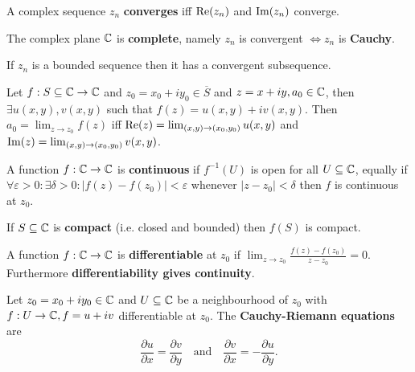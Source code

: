 \begin{multicols}{2}
\begin{theorem}[1.2.9]
A complex sequence $z_n$ \textbf{converges} iff $\mathrm{Re}(z_n)$ and $\mathrm{Im}(z_n)$ converge.
\end{theorem}

\begin{theorem}
The complex plane $\mathbb{C}$ is \textbf{complete}, namely $z_n$ is convergent $\Leftrightarrow z_n$ is \textbf{Cauchy}.
\end{theorem}

\begin{theorem}
If $z_n$ is a bounded sequence then it has a convergent subsequence.
\end{theorem}

\begin{theorem}[1.3.3]
Let $f:S\subseteq\mathbb{C}\to\mathbb{C}$ and $z_0=x_0+iy_0\in\overline{S}$ and $z=x+iy,a_0\in\mathbb{C}$, then $\exists u(x,y),v(x,y)$ such that $f(z) = u(x,y) + iv(x,y)$. Then $a_0=\lim_{z\to z_0}f(z)$ iff $\mathrm{Re}(z) = \lim_{(x,y)\to (x_0,y_0)} u(x,y)$ and $\mathrm{Im}(z)=\lim_{(x,y)\to(x_0,y_0)} v(x,y)$.
\end{theorem}

\begin{definition}
A function $f:\mathbb{C}\to\mathbb{C}$ is \textbf{continuous} if $f^{-1}(U)$ is open for all $U\subseteq\mathbb{C}$, equally if $\forall\varepsilon>0:\exists\delta>0: |f(z)-f(z_0)|<\varepsilon$ whenever $|z-z_0|<\delta$ then $f$ is continuous at $z_0$.
\end{definition}

\begin{theorem}
If $S\subseteq\mathbb{C}$ is \textbf{compact} (i.e. closed and bounded) then $f(S)$ is compact.
\end{theorem}

\begin{definition}
A function $f:\mathbb{C}\to\mathbb{C}$ is \textbf{differentiable} at $z_0$ if $\lim_{z\to z_0}\frac{f(z)-f(z_0)}{z-z_0} = 0$. Furthermore \textbf{differentiability gives continuity}.
\end{definition}

\begin{theorem}
Let $z_0=x_0+iy_0\in\mathbb{C}$ and $U\subseteq \mathbb{C}$ be a neighbourhood of $z_0$ with $f:U\to\mathbb{C}, f=u+iv$ differentiable at $z_0$. The \textbf{Cauchy-Riemann equations} are
    \[
    \frac{\partial u}{\partial x} = \frac{\partial v}{\partial y}
    \quad\text{and}\quad
    \frac{\partial v}{\partial x} = -\frac{\partial u}{\partial y}.
    \]
\end{theorem}


\end{multicols}
